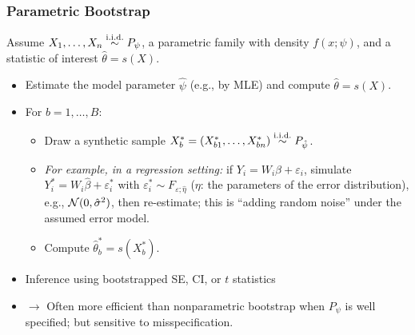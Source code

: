 \documentclass[xcolor=svgnames,9pt,english,aspectratio=169,t]{beamer}
\begin{document}
\begin{frame}
\frametitle{Parametric Bootstrap}
Assume $X_1,\ldots,X_n \stackrel{\rm i.i.d.}{\sim} P_\psi$, a parametric family with density $f(x;\psi)$, and a statistic of interest $\hat\theta=s(X)$.\medskip
\begin{itemize}[<+->]
\item[1.] Estimate the model parameter $\hat\psi$ (e.g., by MLE) and compute $\hat\theta=s(X)$.
\item[2.] For $b=1,\ldots,B$:
\begin{itemize}
\item[(a)] Draw a synthetic sample $X_b^\ast=(X_{b1}^\ast,\ldots,X_{bn}^\ast)\stackrel{{\rm i.i.d.}}{\sim} P_{\hat\psi}$.

\medskip\item[] \emph{For example, in a regression setting:} if $Y_i=W_i\beta+\varepsilon_i$, simulate
$Y_i^\ast=W_i \hat\beta+\varepsilon_i^\ast$ with $\varepsilon_i^\ast\sim F_{\varepsilon;\hat\eta}$ ($\eta$: the parameters of the error distribution), e.g., $\mathcal{N}(0,\hat\sigma^2)$, then re-estimate; this is ``adding random noise'' under the assumed error model.\medskip


\item[(b)] Compute $\hat\theta_b^\ast=s(X_b^\ast)$.
\end{itemize}
\item[3.] Inference using bootstrapped SE, CI, or $t$ statistics
\medskip\item[] $\longrightarrow$ Often more efficient than nonparametric bootstrap when $P_\psi$ is well specified; but sensitive to misspecification.
\end{itemize}
\end{frame}



\end{document}
